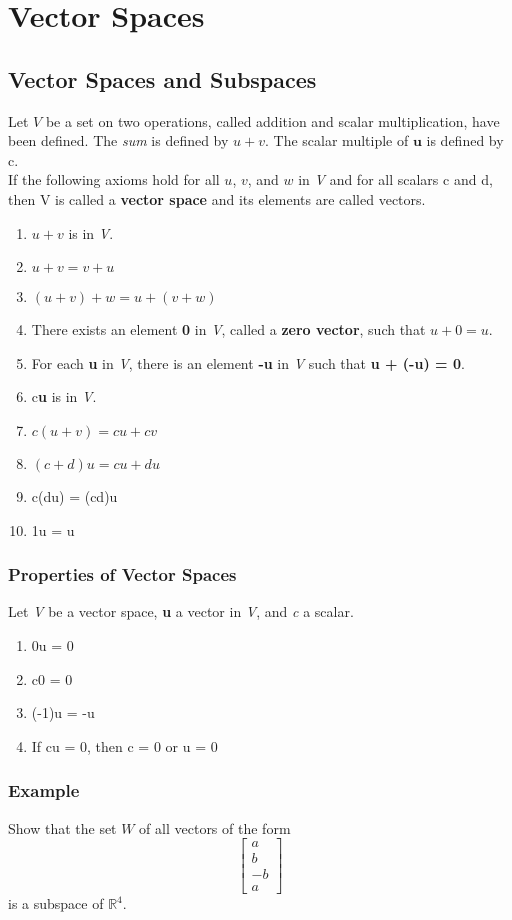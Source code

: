 \setcounter{chapter}{5}
\chapter{Vector Spaces}

\section{Vector Spaces and Subspaces}
Let $V$ be a set on two operations, called addition and scalar multiplication, have been defined. The \textit{sum} is defined by $u+v$. The scalar multiple of $\textbf{u}$ is defined by c.\\
If the following axioms hold for all $u$, $v$, and $w$ in \textit{V} and for all scalars c and d, then V is called a \textbf{vector space} and its elements are called vectors.
\begin{enumerate}
    \item $u+v$ is in \textit{V}.
    \item $u+v = v+u$
    \item $(u+v)+w = u + (v+w)$
    \item There exists an element \textbf{0} in \textit{V}, called a \textbf{zero vector}, such that \textbf{$u+0 = u$}.
    \item For each \textbf{u} in \textit{V}, there is an element \textbf{-u} in \textit{V} such that \textbf{u + (-u) = 0}.
    \item c\textbf{u} is in \textit{V}.
    \item $c(u+v) = cu + cv$
    \item $(c+d)u = cu + du$
    \item c(du) = (cd)u
    \item 1u = u
\end{enumerate}
\subsection*{Properties of Vector Spaces}
Let \textit{V} be a vector space, \textbf{u} a vector in \textit{V}, and \textit{c} a scalar.
\begin{enumerate}
    \item 0u = 0
    \item c0 = 0
    \item (-1)u = -u
    \item If cu = 0, then c = 0 or u = 0
\end{enumerate}
\subsection*{Example}
Show that the set $W$ of all vectors of the form $$\begin{bmatrix}
    a\\b\\-b\\a
\end{bmatrix}$$ is a subspace of $\mathbb{R}^4$.
